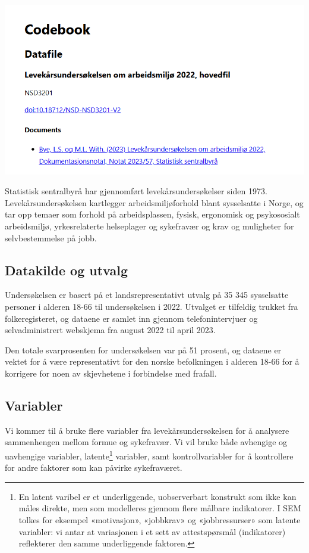 \documentclass[
  12pt,
  a4paper,
  DIV=11,
  numbers=noendperiod]{scrartcl}
\begin{document}
\includegraphics{dokumentobjekter/bilder/codebook.png}

Statistisk sentralbyrå har gjennomført levekårsundersøkelser siden 1973.
Levekårsundersøkelsen kartlegger arbeidsmiljøforhold blant sysselsatte i
Norge, og tar opp temaer som forhold på arbeidsplassen, fysisk,
ergonomisk og psykososialt arbeidsmiljø, yrkesrelaterte helseplager og
sykefravær og krav og muligheter for selvbestemmelse på jobb.

\subsection{Datakilde og utvalg}\label{datakilde-og-utvalg}

Undersøkelsen er basert på et landsrepresentativt utvalg på 35 345
sysselsatte personer i alderen 18-66 til undersøkelsen i 2022. Utvalget
er tilfeldig trukket fra folkeregisteret, og dataene er samlet inn
gjennom telefonintervjuer og selvadministrert webskjema fra august 2022
til april 2023.

Den totale svarprosenten for undersøkelsen var på 51 prosent, og dataene
er vektet for å være representativt for den norske befolkningen i
alderen 18-66 for å korrigere for noen av skjevhetene i forbindelse med
frafall.

\subsection{Variabler}\label{variabler}

Vi kommer til å bruke flere variabler fra levekårsundersøkelsen for å
analysere sammenhengen mellom formue og sykefravær. Vi vil bruke både
avhengige og uavhengige variabler, latente\footnote{En latent varibel er
  et underliggende, uobserverbart konstrukt som ikke kan måles direkte,
  men som modelleres gjennom flere målbare indikatorer. I SEM tolkes for
  eksempel «motivasjon», «jobbkrav» og «jobbressurser» som latente
  variabler: vi antar at variasjonen i et sett av attestspørsmål
  (indikatorer) reflekterer den samme underliggende faktoren.}
variabler, samt kontrollvariabler for å kontrollere for andre faktorer
som kan påvirke sykefraværet.
\end{document}
